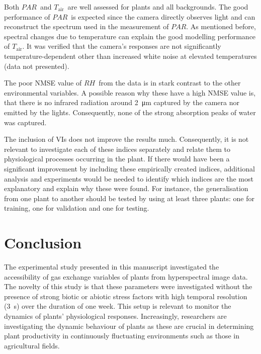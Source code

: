 \documentclass[10pt,authoryear,a4paper]{elsarticle}
\newcommand{\Tair}{$T_\text{air}$}
\newcommand{\RH}{$RH$}
\newcommand{\PAR}{$PAR$}
\begin{document}
    Both \PAR\ and \Tair\ are well assessed for plants and all backgrounds. The good performance of \PAR\ is expected since the camera directly observes light and can reconstruct the spectrum used in the measurement of \PAR. As mentioned before, spectral changes due to temperature can explain the good modelling performance of \Tair. It was verified that the camera's responses are not significantly temperature-dependent other than increased white noise at elevated temperatures (data not presented).
    
    The poor NMSE value of \RH\ from the data is in stark contrast to the other environmental variables.  A possible reason why these have a high NMSE value is, that there is no infrared radiation around \SI{2}{\micro\metre} captured by the camera nor emitted by the lights. Consequently, none of the strong absorption peaks of water was captured.
    
    The inclusion of VIs does not improve the results much. Consequently, it is not relevant to investigate each of these indices separately and relate them to physiological processes occurring in the plant. If there would have been a significant improvement by including these empirically created indices, additional analysis and experiments would be needed to identify which indices are the most explanatory and explain why these were found. For instance, the generalisation from one plant to another should be tested by using at least three plants: one for training, one for validation and one for testing. 
    

\section{Conclusion}
    
    The experimental study presented in this manuscript investigated the accessibility of gas exchange variables of plants from hyperspectral image data. The novelty of this study is that these parameters were investigated without the presence of strong biotic or abiotic stress factors with high temporal resolution (\SI{3}{\second}) over the duration of one week. This setup is relevant to monitor the dynamics of plants' physiological responses. Increasingly, researchers are investigating the dynamic behaviour of plants as these are crucial in determining plant productivity in continuously fluctuating environments such as those in agricultural fields.
    
\end{document}
